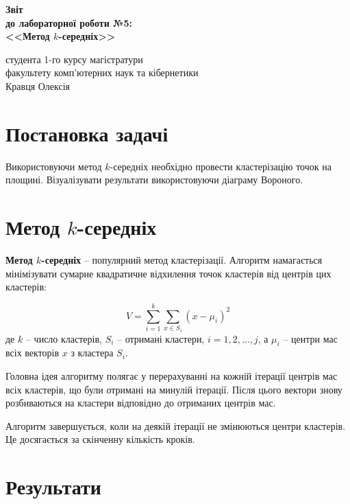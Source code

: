 \documentclass[a4paper,12pt]{article}
\begin{document}
	
	\begin{titlepage}
		\vspace*{6cm}
		\begin{center}
			
			\large
			\textbf{Звіт}\\
			\textbf{до лабораторної роботи №5:}\\
			\textbf{<<Метод $k$-середніх>>}
			
		\end{center}
		
		\vspace{8cm}
		\begin{flushright}
			студента 1-го курсу магістратури\\
			факультету комп'ютерних наук та кібернетики\\
			Кравця Олексія
		\end{flushright}
		
	\end{titlepage}

\newpage
\tableofcontents
\newpage
\section{Постановка задачі}
	Використовуючи метод $k$-середніх необхідно провести кластерізацію точок на площині. Візуалізувати результати використовуючи діаграму Вороного.
\section{Метод $k$-середніх}

\textbf{Метод $k$-середніх} -- популярний метод кластерізації. Алгоритм намагається мінімізувати сумарне квадратичне відхилення точок кластерів від центрів цих кластерів:

\[
	V = \sum_{i=1}^{k}\sum_{x \in S_i} (x - \mu_i)^2
\]
де $k$ -- число кластерів, $S_i$ -- отримані кластери, $i = 1,2,\ldots, j$, а $\mu_i$ -- центри мас всіх векторів $x$ з кластера $S_i$.

Головна ідея алгоритму полягає у перерахуванні на кожній ітерації центрів мас всіх кластерів, що були отримані на минулій ітерації. Після цього вектори знову розбиваються на кластери відповідно до отриманих центрів мас.

Алгоритм завершується, коли на деякій ітерації не змінюються центри кластерів. Це досягається за скінченну кількість кроків.

\section{Результати}
\end{document}
